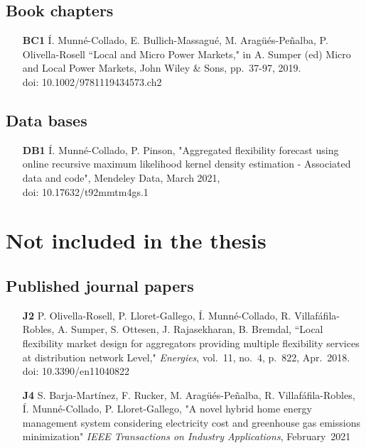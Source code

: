\subsection*{Book chapters}

\begin{itemize}
	\item[\textbf{BC1}] \'{I}. Munn\'{e}-Collado, E. Bullich-Massagu\'{e}, M. Arag\"{u}\'{e}s-Pe\~{n}alba, P. Olivella-Rosell ``Local and Micro Power Markets," in A. Sumper (ed) Micro and Local Power Markets, John Wiley \& Sons, pp.~37-97, 2019. \\doi: 10.1002/9781119434573.ch2
\end{itemize}

\subsection*{Data bases}

\begin{itemize}
	\item [\textbf{DB1}] \'{I}. Munn\'{e}-Collado, P. Pinson, "Aggregated flexibility forecast using online recursive maximum likelihood kernel density estimation - Associated data and code", Mendeley Data, March 2021,  \\doi: 10.17632/t92mmtm4gs.1
\end{itemize}

\section*{Not included in the thesis}

\subsection*{Published journal papers}

\begin{itemize}
	
		\item [\textbf{J2}] P. Olivella-Rosell, P. Lloret-Gallego, \'{I}. Munn\'{e}-Collado, R. Villaf\'{a}fila-Robles, A. Sumper, S. Ottesen, J. Rajasekharan, B. Bremdal, ``Local flexibility market design for aggregators providing multiple flexibility services at distribution network Level," \textit{Energies}, vol.~11, no.~4, p.~822, Apr.~2018. doi: 10.3390/en11040822
	\item [\textbf{J4}]  S. Barja-Mart\'{i}nez, F. Rucker, M. Arag\"{u}\'{e}s-Pe\~{n}alba, R. Villaf\'{a}fila-Robles, \'{I}. Munn\'{e}-Collado, P. Lloret-Gallego, "A novel hybrid home energy management system considering electricity cost and greenhouse gas emissions minimization" \textit{IEEE Transactions on Industry Applications}, February~2021
	
\end{itemize}

